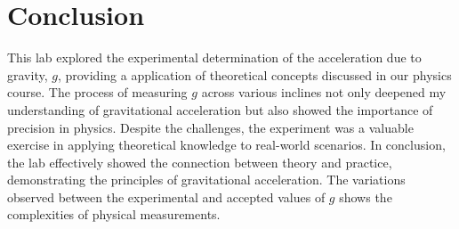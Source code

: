 \documentclass{report}
\begin{document}
    \bigbreak \noindent 
    \section{Conclusion}
    \bigbreak \noindent 
    This lab explored the experimental determination of the acceleration due to gravity, $g$, providing a application of theoretical concepts discussed in our physics course. The process of measuring $g$ across various inclines not only deepened my understanding of gravitational acceleration but also showed the importance of precision in physics. Despite the challenges, the experiment was a valuable exercise in applying theoretical knowledge to real-world scenarios.
    \bigbreak \noindent 
    In conclusion, the lab effectively showed the connection between theory and practice, demonstrating the principles of gravitational acceleration. The variations observed between the experimental and accepted values of $g$ shows the complexities of physical measurements.










    
\end{document}
